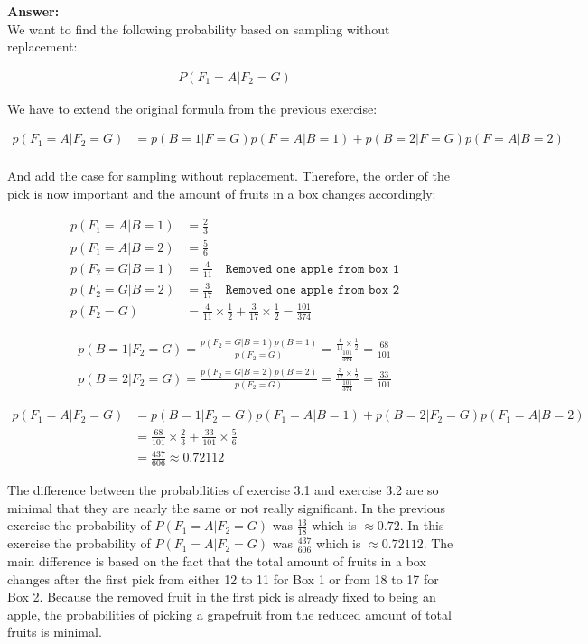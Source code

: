 \documentclass[a4paper]{article}
\begin{document}
\textbf{Answer:}\\

We want to find the following probability based on sampling without replacement:

\begin{align*}
	P(F_1 = A | F_2 = G)
\end{align*}

We have to extend the original formula from the previous exercise:

\begin{align*}
	p(F_1 = A | F_2 = G) &= p(B = 1| F = G)p(F = A | B = 1) + p(B = 2 | F = G)p(F = A | B = 2)\\
\end{align*}

And add the case for sampling without replacement. Therefore, the order of the pick is now important and the amount of fruits in a box changes accordingly:

\begin{align*}
	p(F_1 = A | B = 1) &= \frac{2}{3}\\
	p(F_1 = A | B = 2) &= \frac{5}{6}\\
	p(F_2 = G | B = 1) &= \frac{4}{11}  \quad \texttt{Removed one apple from box 1}\\
	p(F_2 = G | B = 2) &= \frac{3}{17} \quad \texttt{Removed one apple from box 2}\\
		p(F_2 = G) &= \frac{4}{11} \times \frac{1}{2} + \frac{3}{17} \times \frac{1}{2} = \frac{101}{374}
\end{align*}

\begin{align*}
	p(B = 1 | F_2 = G) = \frac{p(F_2 = G | B = 1)p(B = 1)}{p(F_2 = G)} = \frac{\frac{4}{11} \times \frac{1}{2}}{\frac{101}{374}} = \frac{68}{101}\\
	p(B = 2 | F_2 = G) = \frac{p(F_2 = G | B = 2)p(B = 2)}{p(F_2 = G)} = \frac{\frac{3}{17} \times \frac{1}{2}}{\frac{101}{374}} = \frac{33}{101}
\end{align*}

\begin{align*}
	p(F_1 = A | F_2 = G) &=   p(B = 1| F_2 = G)p(F_1 = A | B = 1) + p(B = 2 | F_2 = G)p(F_1 = A | B = 2)\\
	&= \frac{68}{101} \times \frac{2}{3} + \frac{33}{101} \times \frac{5}{6}\\
	&= \frac{437}{606} \approx 0.72112
\end{align*}

The difference between the probabilities of exercise 3.1 and exercise 3.2 are so minimal that they are nearly the same or not really significant. In the previous exercise the probability of $P(F_1 = A | F_2 = G)$ was $\frac{13}{18}$ which is $\approx 0.72$. In this exercise the probability of $P(F_1 = A | F_2 = G)$ was $\frac{437}{606}$ which is $\approx 0.72112$. The main difference is based on the fact that the total amount of fruits in a box changes after the first pick from either 12 to 11 for Box 1 or from 18 to 17 for Box 2. Because the removed fruit in the first pick is already fixed to being an apple, the probabilities of picking a grapefruit from the reduced amount of total fruits is minimal.
\end{document}
